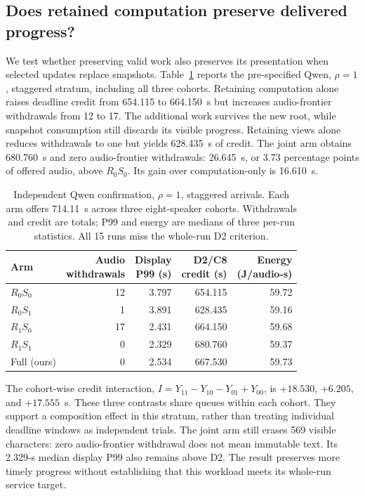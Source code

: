 \subsection{Does retained computation preserve delivered progress?}
We test whether preserving valid work also preserves its presentation when
selected updates replace snapshots.
Table~\ref{tab:core-h3} reports the pre-specified Qwen, $\rho=1$,
staggered stratum, including all three cohorts. Retaining computation
alone raises deadline credit from 654.115 to 664.150~s but increases
audio-frontier withdrawals from 12 to 17. The additional work survives
the new root, while snapshot consumption still discards its visible
progress. Retaining views alone reduces withdrawals to one but yields
628.435~s of credit. The joint arm obtains 680.760~s and zero
audio-frontier withdrawals: 26.645~s, or 3.73 percentage points of offered
audio, above $R_0S_0$. Its gain over computation-only
is 16.610~s.

\begin{table}[t]
\centering
\caption{Independent Qwen confirmation, $\rho=1$, staggered arrivals.
Each arm offers 714.11~s across three eight-speaker cohorts.
Withdrawals and credit are totals; P99 and energy are medians of three
per-run statistics. All 15 runs miss the whole-run D2 criterion.}
\label{tab:core-h3}
\begingroup
\small
\setlength{\tabcolsep}{3pt}
\begin{tabular}{@{}lrrrr@{}}
\toprule
Arm & \shortstack{Audio\\withdrawals} &
\shortstack{Display\\P99 (s)} & \shortstack{D2/C8\\credit (s)} &
\shortstack{Energy\\(J/audio-s)}\\
\midrule
$R_0S_0$ & 12 & 3.797 & 654.115 & 59.72\\
$R_0S_1$ & 1 & 3.891 & 628.435 & 59.16\\
$R_1S_0$ & 17 & 2.431 & 664.150 & 59.68\\
$R_1S_1$ & 0 & 2.329 & 680.760 & 59.37\\
Full (ours) & 0 & 2.534 & 667.530 & 59.73\\
\bottomrule
\end{tabular}
\endgroup
\end{table}

The cohort-wise credit interaction,
$I=Y_{11}-Y_{10}-Y_{01}+Y_{00}$, is
$+18.530$, $+6.205$, and $+17.555$~s. These three contrasts share queues
within each cohort. They support a composition effect
in this stratum, rather than treating individual deadline windows as
independent trials. The joint arm still erases 569 visible characters:
zero audio-frontier withdrawal does not mean immutable text.
Its 2.329-s median display P99 also remains above D2. The result preserves
more timely progress without establishing that this workload meets its
whole-run service target.

